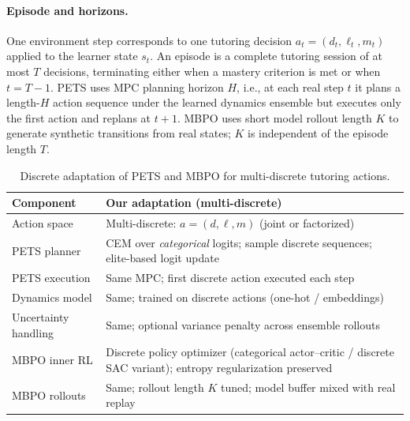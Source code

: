 \documentclass[preprint,12pt]{elsarticle}
\begin{document}
\begin{frontmatter}
\paragraph{Episode and horizons.}
One environment step corresponds to one tutoring decision $a_t=(d_t,\ell_t,m_t)$ applied to the learner state $s_t$. An episode is a complete tutoring session of at most $T$ decisions, terminating either when a mastery criterion is met or when $t=T-1$. PETS uses MPC planning horizon $H$, i.e., at each real step $t$ it plans a length-$H$ action sequence under the learned dynamics ensemble but executes only the first action and replans at $t+1$. MBPO uses short model rollout length $K$ to generate synthetic transitions from real states; $K$ is independent of the episode length $T$.

\begin{table}[t]
\centering
\caption{Discrete adaptation of PETS and MBPO for multi-discrete tutoring actions.}
\label{tab:discrete_adaptation}
\begin{tabular}{p{3.4cm} p{5.4cm}}
\toprule
\textbf{Component} &  \textbf{Our adaptation (multi-discrete)} \\
\midrule
Action space &  Multi-discrete: \(a=(d,\ell,m)\) (joint or factorized) \\
PETS planner &  CEM over \textit{categorical} logits; sample discrete sequences; elite-based logit update \\
PETS execution &  Same MPC; first discrete action executed each step \\
Dynamics model &  Same; trained on discrete actions (one-hot / embeddings) \\
Uncertainty handling & Same; optional variance penalty across ensemble rollouts \\
MBPO inner RL & Discrete policy optimizer (categorical actor–critic / discrete SAC variant); entropy regularization preserved \\
MBPO rollouts &  Same; rollout length \(K\) tuned; model buffer mixed with real replay \\
\bottomrule
\end{tabular}
\end{table}




\end{frontmatter}
\end{document}
